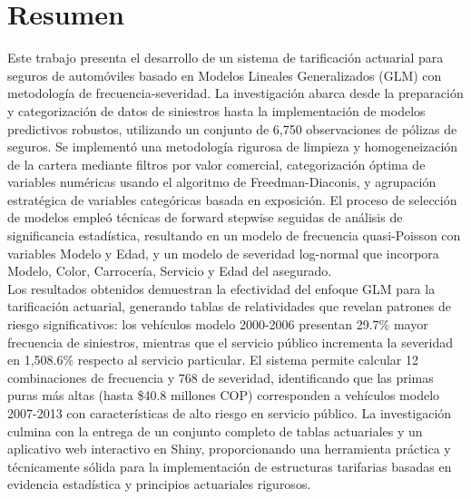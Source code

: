 \section*{Resumen}

Este trabajo presenta el desarrollo de un sistema de tarificación actuarial para seguros de automóviles basado en Modelos Lineales Generalizados (GLM) con metodología de frecuencia-severidad. La investigación abarca desde la preparación y categorización de datos de siniestros hasta la implementación de modelos predictivos robustos, utilizando un conjunto de 6,750 observaciones de pólizas de seguros. Se implementó una metodología rigurosa de limpieza y homogeneización de la cartera mediante filtros por valor comercial, categorización óptima de variables numéricas usando el algoritmo de Freedman-Diaconis, y agrupación estratégica de variables categóricas basada en exposición. El proceso de selección de modelos empleó técnicas de forward stepwise seguidas de análisis de significancia estadística, resultando en un modelo de frecuencia quasi-Poisson con variables Modelo y Edad, y un modelo de severidad log-normal que incorpora Modelo, Color, Carrocería, Servicio y Edad del asegurado.\\

Los resultados obtenidos demuestran la efectividad del enfoque GLM para la tarificación actuarial, generando tablas de relatividades que revelan patrones de riesgo significativos: los vehículos modelo 2000-2006 presentan 29.7\% mayor frecuencia de siniestros, mientras que el servicio público incrementa la severidad en 1,508.6\% respecto al servicio particular. El sistema permite calcular 12 combinaciones de frecuencia y 768 de severidad, identificando que las primas puras más altas (hasta \$40.8 millones COP) corresponden a vehículos modelo 2007-2013 con características de alto riesgo en servicio público. La investigación culmina con la entrega de un conjunto completo de tablas actuariales y un aplicativo web interactivo en Shiny, proporcionando una herramienta práctica y técnicamente sólida para la implementación de estructuras tarifarias basadas en evidencia estadística y principios actuariales rigurosos.

